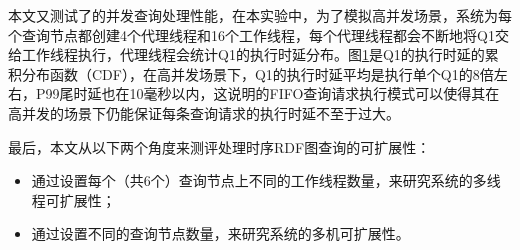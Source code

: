 本文又测试了\sys 的并发查询处理性能，在本实验中，为了模拟高并发场景，系统为每个查询节点都创建4个代理线程和16个工作线程，每个代理线程都会不断地将Q1交给工作线程执行，代理线程会统计Q1的执行时延分布。图\ref{trdfcdf}是Q1的执行时延的累积分布函数（CDF），在高并发场景下，Q1的执行时延平均是执行单个Q1的8倍左右，P99尾时延也在10毫秒以内，这说明\sys 的FIFO查询请求执行模式可以使得其在高并发的场景下仍能保证每条查询请求的执行时延不至于过大。

\begin{figure}[!htb]
\label{trdfcdf}
\end{figure}

最后，本文从以下两个角度来测评\sys 处理时序RDF图查询的可扩展性：
\begin{itemize}
    \item 通过设置每个（共6个）查询节点上不同的工作线程数量，来研究系统的多线程可扩展性；
    \item 通过设置不同的查询节点数量，来研究系统的多机可扩展性。
\end{itemize}

